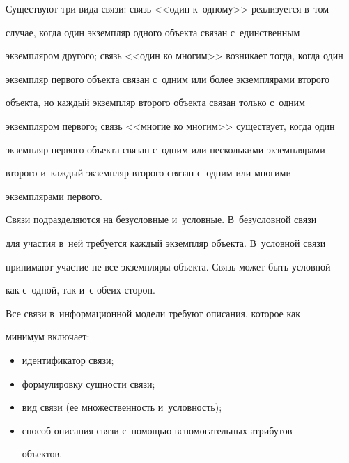     


    Существуют три вида связи: связь <<один к~одному>> реализуется в~том 


случае, когда один экземпляр одного объекта связан с~единственным 


экземпляром другого; связь <<один ко многим>> возникает тогда, когда один 


экземпляр первого объекта связан с~одним или более экземплярами второго 


объекта, но каждый экземпляр второго объекта связан только с~одним 


экземпляром первого; связь <<многие ко многим>> существует, когда один 


экземпляр первого объекта связан с~одним или несколькими экземплярами 


второго и~каждый экземпляр второго связан с~одним или многими 


экземплярами первого.


    


    Связи подразделяются на безусловные и~условные. В~безусловной связи 


для участия в~ней требуется каждый экземпляр объекта. В~условной связи 


принимают участие не все экземпляры объекта. Связь может быть условной 


как с~одной, так и~с обеих сторон.


    


    Все связи в~информационной модели требуют описания, которое как 


минимум включает:


    \begin{itemize}


\item идентификатор связи;


\item формулировку сущности связи;


\item вид связи (ее множественность и~условность);


\item способ описания связи с~помощью вспомогательных атрибутов 


объектов.


\end{itemize}





